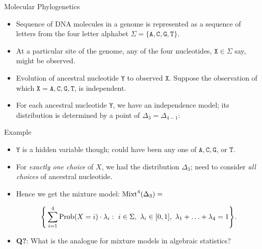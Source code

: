 \begin{frame}{Molecular Phylogenetics}

    \begin{itemize}
        \item Sequence of DNA molecules in a genome is represented as a sequence of letters from the four letter alphabet $\Sigma = \{ \texttt{A}, \texttt{C}, \texttt{G}, \texttt{T} \}$.

        \item At a particular site of the genome, any of the four nucleotides, $\texttt{X} \in \Sigma$ say, might be observed.

        \item Evolution of ancestral nucleotide $\texttt{Y}$ to observed $\texttt{X}$. Suppose the observation of which $\texttt{X} = \texttt{A}, \texttt{C}, \texttt{G}, \texttt{T}$, is independent.

        \item For each ancestral nucleotide $\texttt{Y}$, we have an independence model; its distribution is determined by a point of $\Delta_{3} = \Delta_{4-1}$:

    \end{itemize}

\end{frame}

\begin{frame}{Example}
    \begin{itemize}
        \item  $\texttt{Y}$ is a hidden variable though; could have been any one of $\texttt{A}, \texttt{C}, \texttt{G}$, or $\texttt{T}$.

        \item For \emph{exactly one choice} of $X$, we had the distribution $\Delta_{3}$; need to consider \emph{all choices} of ancestral nucleotide.

        \item Hence we get the mixture model: $\operatorname{Mixt}^{4}(\Delta_{3}) =$

        $$\Bigg\{ \sum_{i = 1}^{4} \Prob(X = i)\cdot \lambda_{i}  :\ i \in \Sigma,\ \lambda_{i} \in [0,1],\ \lambda_{1} + \ldots + \lambda_{4} = 1 \Bigg\}. $$

        \item \textbf{Q?}: What is the analogue for mixture models in algebraic statistics?
    \end{itemize}
\end{frame}


